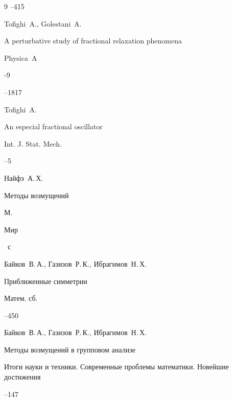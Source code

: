 \begin{thebibliography}{9}
--415

	


\by Tofighi~A., Golestani~A.

\paper A perturbative study of fractional relaxation phenomena

\jour Physica~A


-9

--1817

	


\by Tofighi~A.

\paper An especial fractional oscillator

\jour Int. J. Stat. Mech.



--5




\by Найфэ~А.\,Х.

\book Методы возмущений

\publaddr М.

\publ Мир


~с

	


\by Байков~В.\,А., Газизов~Р.\,К., Ибрагимов~Н.\,Х.

\paper Приближенные симметрии

\jour Матем. сб.



--450

	


\by Байков~В.\,А., Газизов~Р.\,К., Ибрагимов~Н.\,Х.

\paper Методы возмущений в групповом анализе

\jour Итоги науки и техники. Современные проблемы математики. Новейшие достижения



--147





\end{thebibliography}

